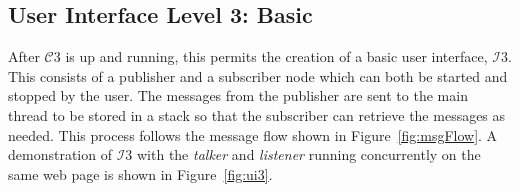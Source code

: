         \subsection{User Interface Level 3: Basic}

        After $\mathcal{C}3$ is up and running, this permits the creation of a basic user interface, $\mathcal{I}3$. This consists of a publisher and a subscriber node which can both be started and stopped by the user. The messages from the publisher are sent to the main thread to be stored in a stack so that the subscriber can retrieve the messages as needed. This process follows the message flow shown in Figure~\ref{fig:msgFlow}. A demonstration of $\mathcal{I}3$ with the \textit{talker} and \textit{listener} running concurrently on the same web page is shown in Figure~\ref{fig:ui3}.

